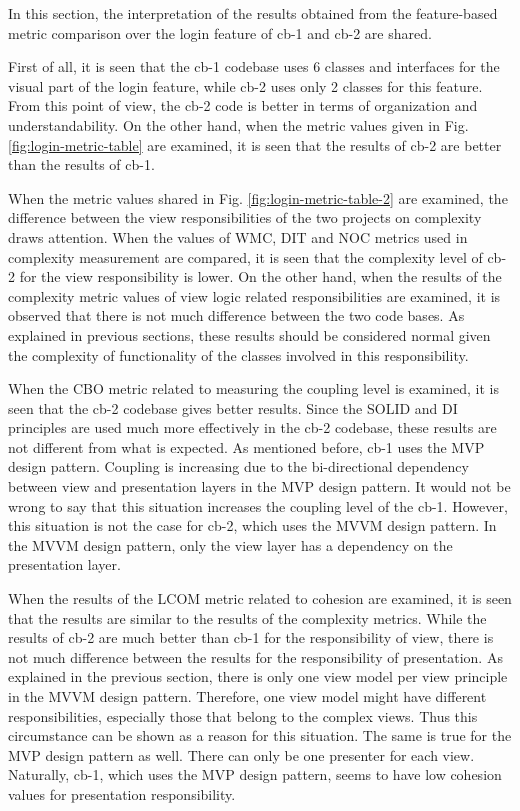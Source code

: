 In this section, the interpretation of the results obtained from the feature-based metric comparison over the login feature of cb-1 and cb-2 are shared.

First of all, it is seen that the cb-1 codebase uses 6 classes and interfaces for the visual part of the login feature, while cb-2 uses only 2 classes for this feature. From this point of view, the cb-2 code is better in terms of organization and understandability. On the other hand, when the metric values given in Fig. \ref{fig:login-metric-table} are examined, it is seen that the results of cb-2 are better than the results of cb-1.

When the metric values shared in Fig. \ref{fig:login-metric-table-2} are examined, the difference between the view responsibilities of the two projects on complexity draws attention. When the values of WMC, DIT and NOC metrics used in complexity measurement are compared, it is seen that the complexity level of cb-2 for the view responsibility is lower. On the other hand, when the results of the complexity metric values of view logic related responsibilities are examined, it is observed that there is not much difference between the two code bases. As explained in previous sections, these results should be considered normal given the complexity of functionality of the classes involved in this responsibility.

When the CBO metric related to measuring the coupling level is examined, it is seen that the cb-2 codebase gives better results. Since the SOLID and DI principles are used much more effectively in the cb-2 codebase, these results are not different from what is expected. As mentioned before, cb-1 uses the MVP design pattern. Coupling is increasing due to the bi-directional dependency between view and presentation layers in the MVP design pattern. It would not be wrong to say that this situation increases the coupling level of the cb-1. However, this situation is not the case for cb-2, which uses the MVVM design pattern. In the MVVM design pattern, only the view layer has a dependency on the presentation layer.

When the results of the LCOM metric related to cohesion are examined, it is seen that the results are similar to the results of the complexity metrics. While the results of cb-2 are much better than cb-1 for the responsibility of view, there is not much difference between the results for the responsibility of presentation. As explained in the previous section, there is only one view model per view principle in the MVVM design pattern. Therefore, one view model might have different responsibilities, especially those that belong to the complex views. Thus this circumstance can be shown as a reason for this situation. The same is true for the MVP design pattern as well. There can only be one presenter for each view. Naturally, cb-1, which uses the MVP design pattern, seems to have low cohesion values for presentation responsibility.

